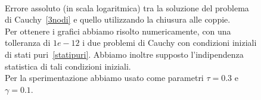 \begin{figure}[!htb]
\centering
\subfloat[][Nodo 1.]{}
\subfloat[][Nodo 2.]{}
\\
\subfloat[][Nodo 3.]{}
\caption[Errori assoluti relativi al grafo~\ref{fig::3nodi} tra modello esatto e chiuso alle coppie] {Errore assoluto (in scala logaritmica) tra la soluzione del problema di Cauchy~\eqref{3nodi} e quello utilizzando la chiusura alle coppie.\\
Per ottenere i grafici abbiamo risolto numericamente, con una tolleranza di $1e-12$ i due problemi di Cauchy con condizioni iniziali di stati puri~\eqref{statipuri}. Abbiamo inoltre supposto l'indipendenza statistica di tali condizioni iniziali.\\
Per la sperimentazione abbiamo usato come parametri $\tau = 0.3$ e $\gamma = 0.1$. }
\label{fig::errori3nodiPair}
\end{figure}



